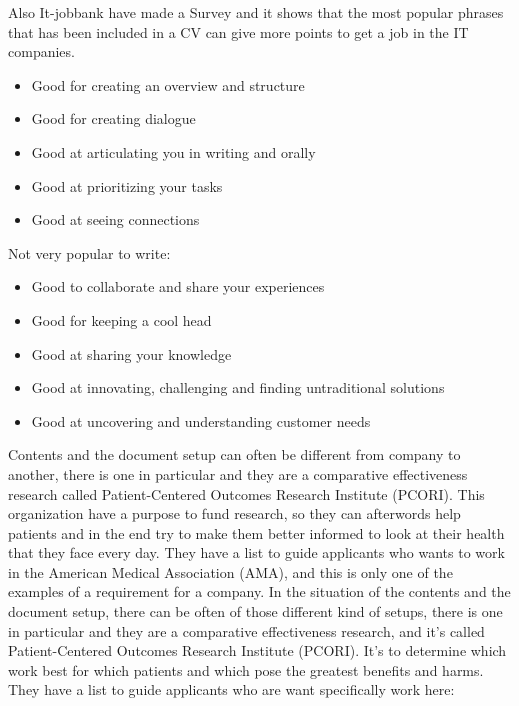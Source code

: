 Also It-jobbank have made a Survey and it shows that the most popular phrases
that has been included in a CV can give more points to get a job in the IT companies.
\begin{itemize}
\item Good for creating an overview and structure
\item Good for creating dialogue
\item Good at articulating you in writing and orally
\item Good at prioritizing your tasks
\item Good at seeing connections
\end{itemize}

Not very popular to write:
\begin{itemize}
\item Good to collaborate and share your experiences
\item Good for keeping a cool head
\item Good at sharing your knowledge
\item Good at innovating, challenging and finding untraditional solutions
\item Good at uncovering and understanding customer needs\cite{10_personal_skills}
\end{itemize}

Contents and the document setup can often be different from company to another,
there is one in particular and they are a comparative effectiveness research called
Patient-Centered Outcomes Research Institute (PCORI).
This organization have a purpose to fund research, so they can afterwords help patients and in the end try to make them better
informed to look at their health that they face every day.\cite{About_PCori}
They have a list to guide applicants who wants to work in the American Medical Association (AMA),
and this is only one of the examples of a requirement for a company.
In the situation of the contents and the document setup, there can be often of those different kind of setups,
there is one in particular and they are a comparative effectiveness research, and it's called
Patient-Centered Outcomes Research Institute (PCORI).
It's to determine which work best for which patients and which pose the greatest benefits and harms. %
They have a list to guide applicants who are want specifically work here:

